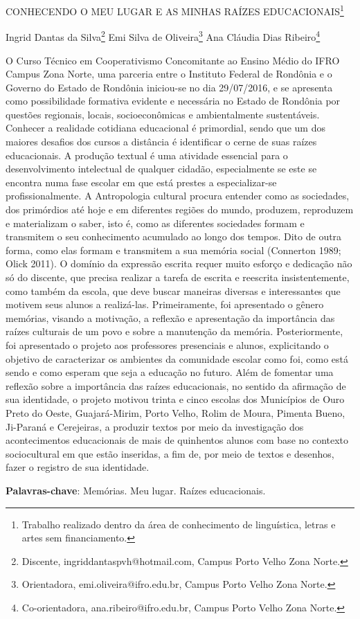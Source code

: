 \documentclass[article,12pt,onesidea,4paper,english,brazil]{abntex2}
\begin{document}
	
	
	\frenchspacing 
	
	\begin{center}
		\LARGE CONHECENDO O MEU LUGAR E AS MINHAS RAÍZES EDUCACIONAIS\footnote{Trabalho realizado dentro da área de conhecimento de linguística, letras e artes sem financiamento.}
		
		\normalsize
		Ingrid Dantas da Silva\footnote{Discente, ingriddantaspvh@hotmail.com, Campus Porto Velho Zona Norte.} 
		Emi Silva de Oliveira\footnote{Orientadora, emi.oliveira@ifro.edu.br, Campus Porto Velho Zona Norte.} 
	Ana Cláudia Dias Ribeiro\footnote{Co-orientadora, ana.ribeiro@ifro.edu.br, Campus Porto Velho Zona Norte.} 
	\end{center}
	
	\noindent O Curso Técnico em Cooperativismo Concomitante ao Ensino Médio do IFRO Campus Zona Norte,
	uma parceria entre o Instituto Federal de Rondônia e o Governo do Estado de Rondônia iniciou-se no
	dia 29/07/2016, e se apresenta como possibilidade formativa evidente e necessária no Estado de
	Rondônia por questões regionais, locais, socioeconômicas e ambientalmente sustentáveis. Conhecer
	a realidade cotidiana educacional é primordial, sendo que um dos maiores desafios dos cursos a
	distância é identificar o cerne de suas raízes educacionais. A produção textual é uma atividade
	essencial para o desenvolvimento intelectual de qualquer cidadão, especialmente se este se encontra
	numa fase escolar em que está prestes a especializar-se profissionalmente. A Antropologia cultural
	procura entender como as sociedades, dos primórdios até hoje e em diferentes regiões do mundo,
	produzem, reproduzem e materializam o saber, isto é, como as diferentes sociedades formam e
	transmitem o seu conhecimento acumulado ao longo dos tempos. Dito de outra forma, como elas
	formam e transmitem a sua memória social (Connerton 1989; Olick 2011). O domínio da expressão
	escrita requer muito esforço e dedicação não só do discente, que precisa realizar a tarefa de escrita e
	reescrita insistentemente, como também da escola, que deve buscar maneiras diversas e
	interessantes que motivem seus alunos a realizá-las. Primeiramente, foi apresentado o gênero
	memórias, visando a motivação, a reflexão e apresentação da importância das raízes culturais de um
	povo e sobre a manutenção da memória. Posteriormente, foi apresentado o projeto aos professores
	presenciais e alunos, explicitando o objetivo de caracterizar os ambientes da comunidade escolar
	como foi, como está sendo e como esperam que seja a educação no futuro. Além de fomentar uma
	reflexão sobre a importância das raízes educacionais, no sentido da afirmação de sua identidade, o
	projeto motivou trinta e cinco escolas dos Municípios de Ouro Preto do Oeste, Guajará-Mirim, Porto
	Velho, Rolim de Moura, Pimenta Bueno, Ji-Paraná e Cerejeiras, a produzir textos por meio da
	investigação dos acontecimentos educacionais de mais de quinhentos alunos com base no contexto
	sociocultural em que estão inseridas, a fim de, por meio de textos e desenhos, fazer o registro de sua
	identidade.
	
	\vspace{\onelineskip}
	
	\noindent
	\textbf{Palavras-chave}: Memórias. Meu lugar. Raízes educacionais.
	
\end{document}

